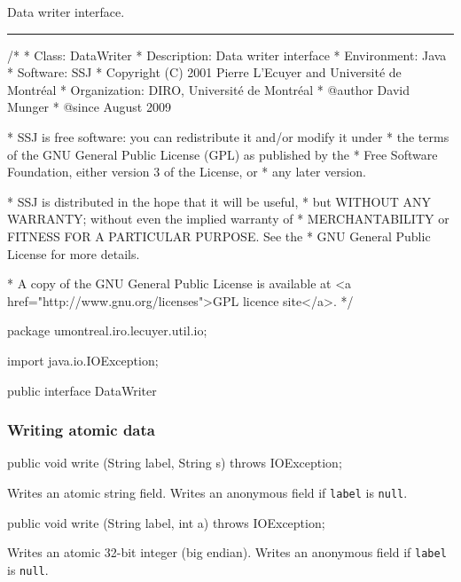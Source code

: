 
Data writer interface.

\bigskip\hrule

\begin{code}
\begin{hide}
/*
 * Class:        DataWriter
 * Description:  Data writer interface
 * Environment:  Java
 * Software:     SSJ 
 * Copyright (C) 2001  Pierre L'Ecuyer and Université de Montréal
 * Organization: DIRO, Université de Montréal
 * @author       David Munger 
 * @since        August 2009

 * SSJ is free software: you can redistribute it and/or modify it under
 * the terms of the GNU General Public License (GPL) as published by the
 * Free Software Foundation, either version 3 of the License, or
 * any later version.

 * SSJ is distributed in the hope that it will be useful,
 * but WITHOUT ANY WARRANTY; without even the implied warranty of
 * MERCHANTABILITY or FITNESS FOR A PARTICULAR PURPOSE.  See the
 * GNU General Public License for more details.

 * A copy of the GNU General Public License is available at
   <a href="http://www.gnu.org/licenses">GPL licence site</a>.
 */
\end{hide}
package umontreal.iro.lecuyer.util.io;
\begin{hide}
import java.io.IOException;
\end{hide}

public interface DataWriter \begin{hide} {

\end{hide}
\end{code}


\subsubsection*{Writing atomic data}
\begin{code}

   public void write (String label, String s) throws IOException;
\end{code}
\begin{tabb}
Writes an atomic string field.
Writes an anonymous field if \texttt{label} is \texttt{null}.
\end{tabb}

\begin{code}

   public void write (String label, int a) throws IOException;
\end{code}
\begin{tabb}
Writes an atomic 32-bit integer (big endian).
Writes an anonymous field if \texttt{label} is \texttt{null}.
\end{tabb}

